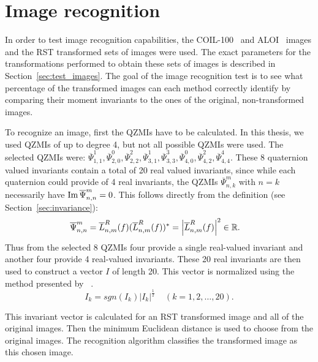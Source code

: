 \section{Image recognition}
In order to test image recognition capabilities, the COIL-100~\cite{coil} and ALOI~\cite{aloi} images and the RST transformed sets of images were used. The exact parameters for the transformations performed to obtain these sets of images is described in Section~\ref{sec:test_images}.
The goal of the image recognition test is to see what percentage of the transformed images can each method correctly identify by comparing their moment invariants to the ones of the original, non-transformed images.

To recognize an image, first the QZMIs have to be calculated. In this thesis, we used QZMIs of up to degree 4, but not all possible QZMIs were used. The selected QZMIs were: $\overline{\Psi}_{1,1}^1, \overline{\Psi}_{2,0}^0, \overline{\Psi}_{2,2}^2, \overline{\Psi}_{3,1}^1, \overline{\Psi}_{3,3}^3, \overline{\Psi}_{4,0}^0, \overline{\Psi}_{4,2}^2, \overline{\Psi}_{4,4}^4$. These 8 quaternion valued invariants contain a total of 20 real valued invariants, since while each quaternion could provide of 4 real invariants, the QZMIs $\overline{\Psi}_{n,k}^m$ with $n = k$ necessarily have $\operatorname{Im}{\overline{\Psi}_{n,n}^m} = 0$.
This follows directly from the definition (see Section~\ref{sec:invariance}): 
\begin{gather*}
    \begin{split}
        \overline{\Psi}_{n,n}^m &= \overline{L}_{n,m}^R(f)(\overline{L}_{n,m}^R(f))^* = \left|\overline{L}_{n,m}^R(f)\right|^2 \in \mathbb{R}.
    \end{split}
\end{gather*}
Thus from the selected 8 QZMIs four provide a single real-valued invariant and another four provide 4 real-valued invariants. These 20 real invariants are then used to construct a vector $I$ of length 20.
This vector is normalized using the method presented by \citeauthor{affine_color}~\cite{affine_color}.
$$
I_k = sgn(I_k)\left|I_k\right|^\frac{1}{2} \;\;\;\; (k = 1,2,\ldots,20).
$$

This invariant vector is calculated for an RST transformed image and all of the original images. Then the minimum Euclidean distance is used to choose from the original images. The recognition algorithm classifies the transformed image as this chosen image.

